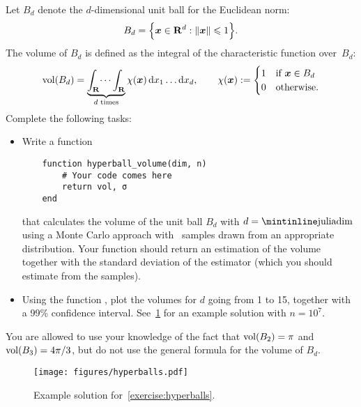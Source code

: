 \begin{compexercise}
    \label{exercise:hyperballs}
    Let $B_{d}$ denote the $d$-dimensional unit ball for the Euclidean norm:
    \[
        B_{d} = \Bigl\{ \mathbf{\boldsymbol{x}} \in \mathbf R^d : \lVert\mathbf{\boldsymbol{x}}\rVert \leqslant 1 \Bigr\}.
    \]
    The volume of $B_{d}$ is defined as the integral of the characteristic function over~$B_d$:
    \[
        {\rm vol}(B_d) = \underbrace{\int_{\mathbf R} \dots \int_{\mathbf R}}_{\text{$d$ times}} \chi(\mathbf{\boldsymbol{x}}) \, \mathrm d x_1 \dots \mathrm d x_d,
        \qquad
        \chi(\mathbf{\boldsymbol{x}}) :=
        \begin{cases}
            1 & \text{if $\mathbf{\boldsymbol{x}} \in B_d$} \\
            0 & \text{otherwise.}
        \end{cases}
    \]
    Complete the following tasks:
    \begin{itemize}
        \item
            Write a function
    \begin{verbatim}
    function hyperball_volume(dim, n)
        # Your code comes here
        return vol, σ
    end
    \end{verbatim}
            that calculates the volume of the unit ball $B_{d}$ with $d = \text{\julia{dim}}$
            using a Monte Carlo approach with~ samples drawn from an appropriate distribution.
            Your function should return an estimation of the volume
            together with the standard deviation of the estimator
            (which you should estimate from the samples).

        \item
            Using the function ,
            plot the volumes for $d$ going from 1 to 15,
            together with a 99\% confidence interval.
            See~\cref{fig:hyperballs} for an example solution with $n = 10^7$.
    \end{itemize}
    You are allowed to use your knowledge of the fact that
    ${\rm vol}(B_2) = \pi$ and ${\rm vol}(B_3) = 4\pi/3$,
    but do not use the general formula for the volume of $B_d$.
\end{compexercise}
\begin{figure}[ht]
    \centering
    \texttt{[image: figures/hyperballs.pdf]}
    \caption{Example solution for~\cref{exercise:hyperballs}.}%
    \label{fig:hyperballs}
\end{figure}

